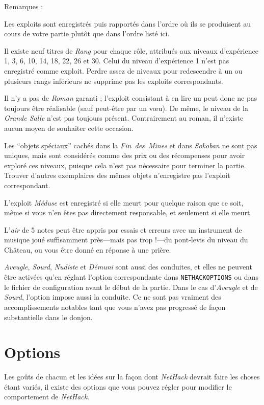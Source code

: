 \documentclass[titlepage]{article}
\begin{document}
\noindent
Remarques :

Les exploits sont enregistrés puis rapportés dans l'ordre où ils
se produisent au cours de votre partie plutôt que dans l'ordre listé ici.

Il existe neuf titres de \textit{Rang} pour chaque rôle, attribués aux niveaux
d'expérience 1, 3, 6, 10, 14, 18, 22, 26 et 30.
Celui du niveau d'expérience 1 n'est pas enregistré comme exploit.
Perdre assez de niveaux pour redescendre à un ou plusieurs rangs inférieurs ne
supprime pas les exploits correspondants.

Il n'y a pas de \textit{Roman} garanti ; l'exploit consistant à en lire un peut donc
ne pas toujours être réalisable (sauf peut-être par un vœu).
De même, le niveau de la \textit{Grande Salle} n'est pas toujours présent.
Contrairement au roman, il n'existe aucun moyen de souhaiter cette occasion.

Les ``objets spéciaux'' cachés dans la \textit{Fin~des~Mines} et dans \textit{Sokoban}
ne sont pas uniques, mais sont considérés comme des prix ou des récompenses
pour avoir exploré ces niveaux, puisque cela n'est pas nécessaire pour terminer
la partie.
Trouver d'autres exemplaires des mêmes objets n'enregistre pas
l'exploit correspondant.

L'exploit \textit{Méduse} est enregistré si elle meurt pour quelque raison que ce soit,
même si vous n'en êtes pas directement responsable, et seulement si elle meurt.

L'\textit{air} de 5 notes peut être appris par essais et erreurs avec un instrument
de musique joué suffisamment
près---mais pas trop !---du
pont-levis du niveau du Château, ou vous être donné en réponse à une prière.

\textit{Aveugle}, \textit{Sourd}, \textit{Nudiste} et \textit{Démuni} sont aussi des conduites, et elles ne peuvent être
activées qu'en réglant l'option correspondante dans \texttt{NETHACKOPTIONS}
ou dans le fichier de configuration avant le début de la partie.
Dans le cas d'\textit{Aveugle} et de \textit{Sourd}, l'option impose aussi la
conduite.
Ce ne sont pas vraiment des accomplissements notables tant que vous n'avez pas
progressé de façon substantielle dans le donjon.

\section{Options}

Les goûts de chacun et les idées sur la façon dont \textit{NetHack} devrait
faire les choses étant variés, il existe des options que vous pouvez
régler pour modifier le comportement de \textit{NetHack}.
\end{document}
